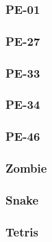 \subsubsection*{PE-01}
\subsubsection*{PE-27}
\subsubsection*{PE-33}
\subsubsection*{PE-34}
\subsubsection*{PE-46}
\subsubsection*{Zombie}
\subsubsection*{Snake}
\subsubsection*{Tetris}
